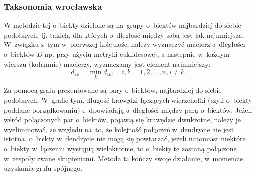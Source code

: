 \documentclass[12pt,a4paper]{report}
\begin{document}
\subsubsection{Taksonomia wrocławska}


W metodzie tej o~biekty dzielone są na~grupy o~biektów najbardziej do siebie podobnych, tj. takich, dla których o~dległość między sobą jest jak najmniejsza. W~związku z~tym w~pierwszej kolejności należy wyznaczyć macierz o~dległości o~biektów $D$ np. przy użyciu metryki euklidesowej, a następnie w~każdym wierszu (kolumnie) macierzy, wyznaczamy jest element najmniejszy: 
$$
d_{ik}= \min\limits_{k} {d_{ik}}, \quad i,k=1,2,\dots,n, i\neq k.
$$

Za pomocą grafu prezentowane są pary o~biektów, najbardziej do siebie podobnych. W~grafie tym, długość krawędzi łączących wierzchołki (czyli o~biekty poddane porządkowaniu) o~dpowiadają o~dległości między parą o~biektów. Jeżeli wśród połączonych par o~biektów, pojawią się krawędzie dwukrotne, należy je wyeliminować, ze względu na~to, że kolejność połączeń w~dendrycie nie jest istotna. o~biekty w~dendrycie nie mogą się powtarzać, jeżeli natomiast niektóre o~biekty w~łączeniu wystąpią wielokrotnie, to o~biekty te zostaną połączone w~zespoły zwane skupieniami. Metoda ta kończy swoje działanie, w~momencie uzyskania grafu spójnego. 
\end{document}
